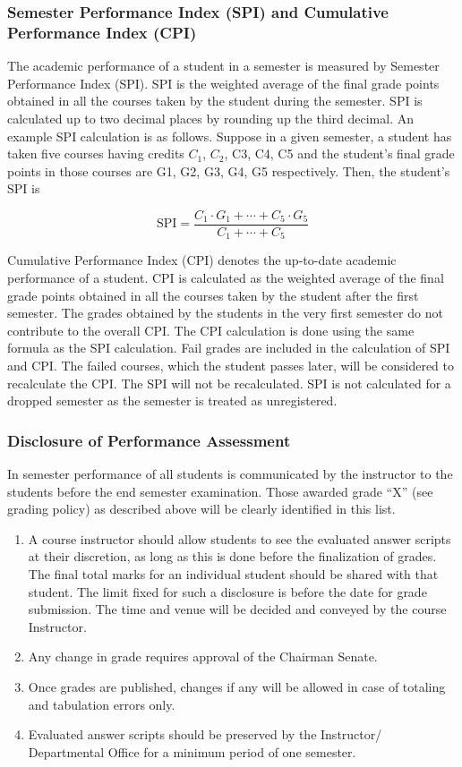 \subsubsection{Semester Performance Index (SPI) and Cumulative Performance Index (CPI)}

The academic performance of a student in a semester is measured by Semester Performance Index (SPI). SPI is the weighted average of the final grade points obtained in all the courses taken by the student during the semester. SPI is calculated up to two decimal places by rounding up the third decimal. An example SPI calculation is as follows. Suppose in a given semester, a student has taken five courses having credits $C_1$, $C_2$, C3, C4, C5 and the student’s final grade points in those courses are G1, G2, G3, G4, G5 respectively. Then, the student’s SPI is

\[\mathrm{SPI}=\frac{C_1\cdot G_1+ \cdots + C_5 \cdot G_5}{C_1+ \cdots +C_5}\]

Cumulative Performance Index (CPI) denotes the up-to-date academic performance of a student. CPI is calculated as the weighted average of the final grade points obtained in all the courses taken by the student after the first semester. The grades obtained by the students in the very first semester do not contribute to the overall CPI. The CPI calculation is done using the same formula as the SPI calculation. Fail grades are included in the calculation of SPI and CPI. The failed courses, which the student passes later, will be considered to recalculate the CPI. The SPI will not be recalculated. SPI is not calculated for a dropped semester as the semester is treated as unregistered. 

\subsubsection{Disclosure of Performance Assessment}

In semester performance of all students is communicated by the instructor to the students before the end semester examination. Those awarded grade “X” (see grading policy) as described above will be clearly identified in this list.

\begin{enumerate}
    \item A course instructor should allow students to see the evaluated answer scripts at their discretion, as long as this is done before the finalization of grades. The final total marks for an individual student should be shared with that student. The limit fixed for such a disclosure is before the date for grade submission. The time and venue will be decided and conveyed by the course Instructor.
    \item Any change in grade requires approval of the Chairman Senate.
    \item Once grades are published, changes if any will be allowed in case of totaling and tabulation errors only. 
    \item Evaluated answer scripts should be preserved by the Instructor/ Departmental Office for a minimum period of one semester. 
\end{enumerate}

